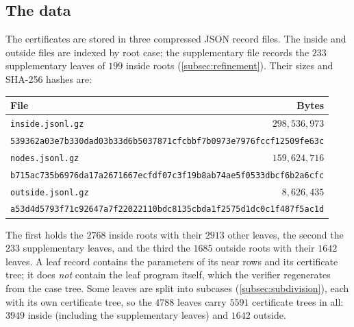 \subsection{The data}\label{subsec:data}
The certificates are stored in three compressed JSON record files. The inside and
outside files are indexed by root case; the supplementary file records the $233$
supplementary leaves of $199$ inside roots (\cref{subsec:refinement}). Their sizes and SHA-256 hashes are:
\begin{center}
\small
\begin{tabular}{lr}
\toprule
File & Bytes \\
\midrule
\texttt{inside.jsonl.gz} & $298{,}536{,}973$ \\
\multicolumn{2}{l}{\scriptsize\texttt{539362a03e7b330dad03b33d6b5037871cfcbbf7b0973e7976fccf12509fe63c}}\\[2pt]
\texttt{nodes.jsonl.gz} & $159{,}624{,}716$ \\
\multicolumn{2}{l}{\scriptsize\texttt{b715ac735b6976da17a2671667ecfdf07c3f19b8ab74ae5f0533dbcf6b2a6cfc}}\\[2pt]
\texttt{outside.jsonl.gz} & $8{,}626{,}435$ \\
\multicolumn{2}{l}{\scriptsize\texttt{a53d4d5793f71c92647a7f22022110bdc8135cbda1f2575d1dc0c1f487f5ac1d}}\\
\bottomrule
\end{tabular}
\end{center}
The first holds the $2768$ inside roots with their $2913$ other leaves, the second the $233$
supplementary leaves, and the third the $1685$
outside roots with their $1642$ leaves. A leaf record contains the parameters of its near rows
and its certificate tree; it does \emph{not} contain the leaf program itself, which the verifier
regenerates from the case tree. Some leaves are split into subcases (\cref{subsec:subdivision}), each with
its own certificate tree, so the $4788$ leaves carry $5591$ certificate trees in all: $3949$
inside (including the supplementary leaves) and $1642$ outside.

